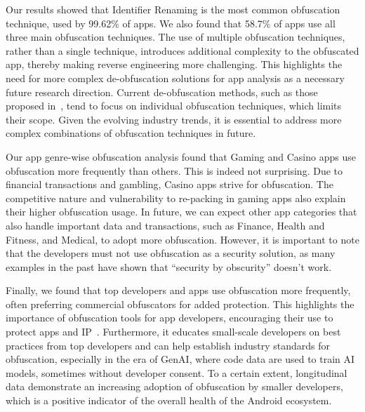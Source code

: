  Our results showed that Identifier Renaming is the most common obfuscation technique, used by 99.62\% of apps. We also found that 58.7\% of apps use all three main obfuscation techniques. The use of multiple obfuscation techniques, rather than a single technique, introduces additional complexity to the obfuscated app, thereby making reverse engineering more challenging. This highlights the need for more complex de-obfuscation solutions for app analysis as a necessary future research direction. Current de-obfuscation methods, such as those proposed in~\cite{bichsel2016statistical, baumann2017anti, you2022deoptfuscator}, tend to focus on individual obfuscation techniques, which limits their scope. Given the evolving industry trends, it is essential to address more complex combinations of obfuscation techniques in future. \\ \vspace{-3mm}


 Our app genre-wise obfuscation analysis found that Gaming and Casino apps use obfuscation more frequently than others. This is indeed not surprising. Due to financial transactions and gambling, Casino apps strive for obfuscation. The competitive nature and vulnerability to re-packing in gaming apps also explain their higher obfuscation usage. In future, we can expect other app categories that also handle important data and transactions, such as Finance, Health and Fitness, and Medical, to adopt more obfuscation. However, it is important to note that the developers must not use obfuscation as a security solution, as many examples in the past have shown that ``security by obscurity'' doesn't work. \\ \vspace{-3mm}

 Finally, we found that top developers and apps use obfuscation more frequently, often preferring commercial obfuscators for added protection. This highlights the importance of obfuscation tools for app developers, encouraging their use to protect apps and IP~\cite{faruki2016android}. Furthermore, it educates small-scale developers on best practices from top developers and can help establish industry standards for obfuscation, especially in the era of GenAI, where code data are used to train AI models, sometimes without developer consent. To a certain extent, longitudinal data demonstrate an increasing adoption of obfuscation by smaller developers, which is a positive indicator of the overall health of the Android ecosystem. \\ \vspace{-7mm}


